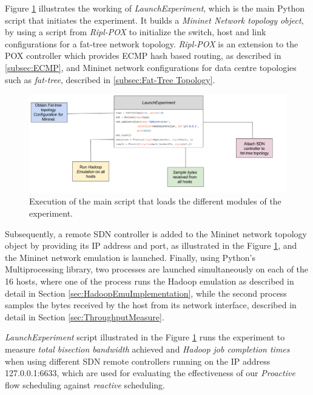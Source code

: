 Figure \ref{fig:ExecutionOverview} illustrates the working of \textit{LaunchExperiment}, which is the main Python script that initiates the experiment. It builds a \textit{Mininet Network topology object}, by using a script from \textit{Ripl-POX} \cite{riplPOX} to initialize the switch, host and link configurations for a fat-tree network topology. \textit{Ripl-POX} is an extension to the POX controller which provides ECMP hash based routing, as described in \ref{subsec:ECMP}, and Mininet network configurations for data centre topologies such as \textit{fat-tree}, described in \ref{subsec:Fat-Tree Topology}.   

\begin{figure}[!ht] 
	\centerline{\includegraphics[scale=0.38]{graphics/chapter5/MainExecution.png}}
	\caption{Execution of the main script that loads the different modules of the experiment.}
	\label{fig:ExecutionOverview}
\end{figure}

Subsequently, a remote SDN controller is added to the Mininet network topology object by providing its IP address and port, as illustrated in the Figure \ref{fig:ExecutionOverview}, and the Mininet network emulation is launched. Finally, using Python's Multiprocessing library, two processes are launched simultaneously on each of the 16 hosts, where one of the process runs the Hadoop emulation as described in detail in Section \ref{sec:HadoopEmuImplementation}, while the second process samples the bytes received by the host from its network interface, described in detail in Section \ref{sec:ThroughputMeasure}.

\textit{LaunchExperiment} script illustrated in the Figure \ref{fig:ExecutionOverview} runs the experiment to measure \textit{total bisection bandwidth} achieved and \textit{Hadoop job completion times} when using different SDN remote controllers running on the IP address 127.0.0.1:6633, which are used for evaluating the effectiveness of our \textit{Proactive} flow scheduling against \textit{reactive} scheduling.      


